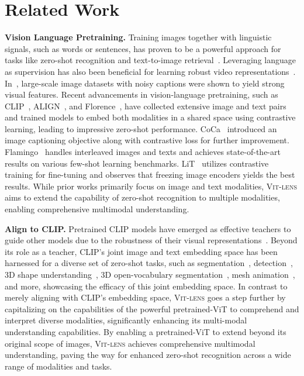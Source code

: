 \documentclass{article}
\newcommand{\ptvit}{pretrained-ViT\xspace}
\newcommand{\methodname}{{\scshape Vit-lens}\xspace}
\begin{document}
\section{Related Work}
\textbf{Vision Language Pretraining.} Training images together with linguistic signals, such as words or sentences, has proven to be a powerful approach for tasks like zero-shot recognition and text-to-image retrieval~\cite{faghri2017vse++,frome2013devise,kiros2014unifying,socher2014grounded}. Leveraging language as supervision has also been beneficial for learning robust video representations~\cite{alayrac2020self,miech2020end,miech2019howto100m}. In~\cite{joulin2016learning}, large-scale image datasets with noisy captions were shown to yield strong visual features. Recent advancements in vision-language pretraining, such as CLIP~\cite{openai_clip}, ALIGN~\cite{jia2021align}, and Florence~\cite{yuan2021florence}, have collected extensive image and text pairs and trained models to embed both modalities in a shared space using contrastive learning, leading to impressive zero-shot performance. CoCa~\cite{yu2022coca} introduced an image captioning objective along with contrastive loss for further improvement. Flamingo~\cite{alayrac2022flamingo} handles interleaved images and texts and achieves state-of-the-art results on various few-shot learning benchmarks. LiT~\cite{zhai2022lit} utilizes contrastive training for fine-tuning and observes that freezing image encoders yields the best results. While prior works primarily focus on image and text modalities, \methodname aims to extend the capability of zero-shot recognition to multiple modalities, enabling comprehensive multimodal understanding.

\textbf{Align to CLIP.} 
Pretrained CLIP models have emerged as effective teachers to guide other models due to the robustness of their visual representations~\cite{peng2022beitv2,fang2023eva,wei2022contrastive}. Beyond its role as a teacher, CLIP's joint image and text embedding space has been harnessed for a diverse set of zero-shot tasks, such as segmentation~\cite{li2022languagedriven}, detection~\cite{gu2021open,zhou2022detecting}, 3D shape understanding~\cite{xue2023ulip,xue2023ulip2,liu2023openshape,zhang2022pointclip,zhu2022pointclipv2}, 3D open-vocabulary segmentation~\cite{Peng2023OpenScene}, mesh animation~\cite{youwang2022clipactor}, and more, showcasing the efficacy of this joint embedding space.
In contrast to merely aligning with CLIP's embedding space, \methodname goes a step further by capitalizing on the capabilities of the powerful \ptvit to comprehend and interpret diverse modalities, significantly enhancing its multi-modal understanding capabilities. By enabling a \ptvit to extend beyond its original scope of images, \methodname achieves comprehensive multimodal understanding, paving the way for enhanced zero-shot recognition across a wide range of modalities and tasks.
\end{document}
